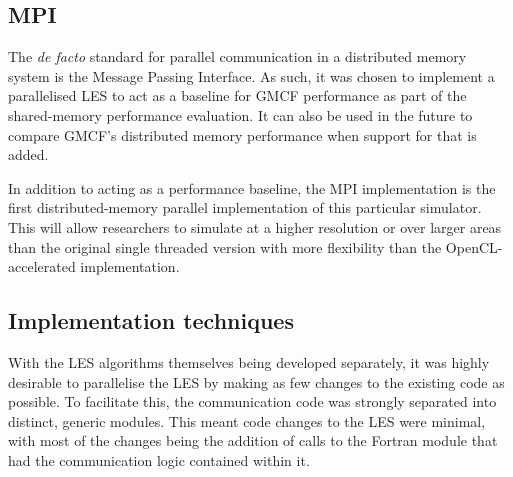 \subsection{MPI}

The \textit{de facto} standard for parallel communication in a distributed
memory system is the Message Passing Interface. As such, it was chosen to
implement a parallelised LES to act as a baseline for GMCF performance as part
of the shared-memory performance evaluation. It can also be used in the future
to compare GMCF's distributed memory performance when support for that is added.

In addition to acting as a performance baseline, the MPI implementation is the
first distributed-memory parallel implementation of this particular simulator.
This will allow researchers to simulate at a higher resolution or over larger
areas than the original single threaded version with more flexibility than the
OpenCL-accelerated implementation.

\subsection{Implementation techniques}

With the LES algorithms themselves being developed separately, it was highly
desirable to parallelise the LES by making as few changes to the existing code
as possible. To facilitate this, the communication code was strongly separated
into distinct, generic modules. This meant code changes to the LES were minimal,
with most of the changes being the addition of calls to the Fortran module that
had the communication logic contained within it.
